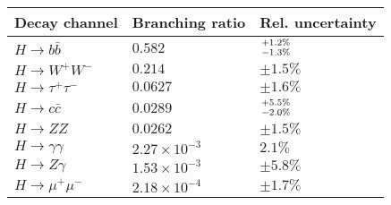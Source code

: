 \begin{table}
\centering
\scriptsize
\begin{tabular}{|l|l|l|}
    \hline
    Decay channel & Branching ratio & Rel. uncertainty  \\
    \hline
    $ H \to b \bar{b}        $    & $0.582               $    & $ +1.2\% \atop -1.3\% $ \\
    $ H \to W^+ W^-          $    & $0.214               $    & $\pm 1.5\%        $   \\
    $ H \to \tau^+ \tau^-    $    & $0.0627              $    & $\pm 1.6\%        $   \\
    $ H \to c \bar{c}        $    & $0.0289              $    & $ +5.5\% \atop -2.0\% $ \\
    $ H \to ZZ               $    & $0.0262              $    & $\pm 1.5\%        $   \\
    $ H \to \gamma \gamma    $    & $2.27 \times 10^{-3} $    & $    2.1\%        $   \\
    $ H \to Z \gamma         $    & $1.53 \times 10^{-3} $    & $\pm 5.8\%        $  \\
    $ H \to \mu^+ \mu^-      $    & $2.18 \times 10^{-4} $    & $\pm 1.7\%        $  \\
    \hline
\end{tabular}
\end{table}
